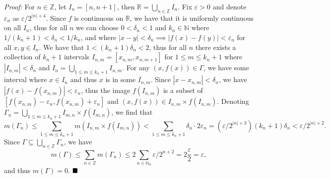 \documentclass[12pt]{article}
\newcommand{\N}{\ensuremath{\mathbb{N}}}
\newcommand{\Z}{\ensuremath{\mathbb{Z}}}
\newcommand{\R}{\ensuremath{\mathbb{R}}}
\newcommand{\e}{\ensuremath{\varepsilon}}
\renewcommand{\d}{\ensuremath{\delta}}
\newcommand{\vertb}[1]{\left\vert#1\right\vert}
\newcommand{\proof}{\textit{Proof: }}
\newcommand{\done}{\ensuremath{\strut\hfill\blacksquare}}
\begin{document}
\proof
For \( n \in \Z \), let \( I_n = [n,n + 1] \), then
\( \R = \bigcup_{n \in \Z} I_n \).
Fix \( \e > 0 \) and denote \( \e_n \) as \( \e/2^{\vertb{n} + 4} \).
Since \( f \) is continuous on \( \R \), we have that it is uniformly
continuous on all \( I_n \), thus for all \( n \) we can choose
\( 0 < \d_n < 1 \) and \( k_n \in \N \) where \( 1/(k_n + 1) < \d_n < 1/k_n \),
and where \( \vertb{x - y} < \d_n \implies \vertb{f(x) - f(y)} < \e_n \) for
all \( x,y \in I_n \).
We have that \( 1 < (k_n + 1)\d_n < 2 \), thus for all \( n \) there exists a
collection of \( k_n + 1 \) intervals \( I_{n,m} = [x_{n,m}, x_{n,m+1}] \) for
\( 1 \leq m \leq k_n + 1 \) where \( \vertb{I_{n,m}} < \d_n \) and
\( I_n = \bigcup_{1 \leq m \leq k_n + 1} I_{n,m} \).
For any \( (x,f(x)) \in \Gamma \), we have some interval where
\( x \in I_{n} \) and thus \( x \) is in some \( I_{n,m} \).
Since \( \vertb{x - x_{n,m}} < \d_n \), we have
\( \vertb{f(x) - f(x_{n,m})} < \e_n \),
thus the image \( f(I_{n,m}) \) is a
subset of \( [f(x_{n,m}) - \e_n, f(x_{n,m}) + \e_n] \)
and \( (x,f(x)) \in I_{n,m} \times f(I_{n,m}) \).
Denoting
\( \Gamma_n = \bigcup_{1 \leq m \leq k_n + 1} I_{m,n} \times f(I_{m,n}) \),
we find that
\[
	m(\Gamma_n)
	\leq \sum_{1 \leq m \leq k_n + 1} m(I_{n,m} \times f(I_{m,n}))
	< \sum_{1 \leq m \leq k_n + 1} \d_n \cdot 2\e_n
	= (\e/2^{\vertb{n} + 3})(k_n + 1)\d_n
	< \e/2^{\vertb{n} + 2}.
\]
Since \( \Gamma \subseteq \bigcup_{n \in \Z} \Gamma_n \), we have
\[
	m(\Gamma)
	\leq \sum_{n \in \Z} m(\Gamma_n)
	\leq 2\sum_{n \in \N_0} \e/2^{n + 2}
	= 2\frac{\e}{2}
	= \e,
\]
and thus \( m(\Gamma) = 0 \).
\done

\end{document}
